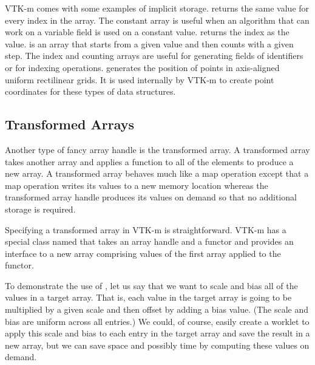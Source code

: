 VTK-m comes with some examples of implicit storage.
 returns the same value for every index in
the array. The constant array is useful when an algorithm that can work on
a variable field is used on a constant value. 
returns the index as the value.  is an array
that starts from a given value and then counts with a given step. The index
and counting arrays are useful for generating fields of identifiers or for
indexing operations. 
generates the position of points in axis-aligned uniform rectilinear grids.
It is used internally by VTK-m to create point coordinates for these types
of data structures.


\subsection{Transformed Arrays}
\label{sec:TransformedArrays}


Another type of fancy array handle is the transformed array. A transformed
array takes another array and applies a function to all of the elements to
produce a new array. A transformed array behaves much like a map operation
except that a map operation writes its values to a new memory location
whereas the transformed array handle produces its values on demand so that
no additional storage is required.

Specifying a transformed array in VTK-m is straightforward. VTK-m has a
special class named  that takes an array
handle and a functor and provides an interface to a new array comprising
values of the first array applied to the functor.

To demonstrate the use of , let us say
that we want to scale and bias all of the values in a target array. That
is, each value in the target array is going to be multiplied by a given
scale and then offset by adding a bias value. (The scale and bias are
uniform across all entries.) We could, of course, easily create a worklet
to apply this scale and bias to each entry in the target array and save the
result in a new array, but we can save space and possibly time by computing
these values on demand.

